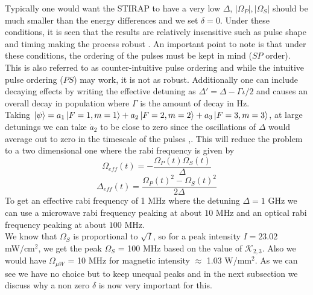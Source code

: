 \documentclass[%
 reprint,
 amsmath,amssymb,
 aps,
]{revtex4-2}
\begin{document}
Typically one would want the STIRAP to have a very low $\Delta$, $|\Omega_P|,|\Omega_S|$ should be much smaller than the energy differences and we set $\delta=0$. Under these conditions, it is seen that the results are relatively insensitive such as pulse shape and timing making the process robust \cite{stirap}. An important point to note is that under these conditions, the ordering of the pulses must be kept in mind ($SP$ order). This is also referred to as counter-intuitive pulse ordering and while the intuitive pulse ordering ($PS$) may work, it is not as robust. Additionally one can include decaying effects by writing the effective detuning as $\Delta' = \Delta - \Gamma\iota/2$ and causes an overall decay in population \cite{PhysRevA.56.1463} where $\Gamma$ is the amount of decay in Hz.\\
Taking $\ket{\psi} = a_1\ket{F=1,m=1}+a_2\ket{F=2,m=2}+a_3\ket{F=3,m=3}$, at large detunings we can take $\dot{a}_2$ to be close to zero since the oscillations of $\Delta$ would average out to zero in the timescale of the pulses \cite{book:693009},\cite{PhysRevA.55.648}. This will reduce the problem to a two dimensional one where the rabi frequency is given by
\begin{equation}\Omega_{eff}(t) = -\dfrac{\Omega_P(t)\Omega_S(t)}{\Delta}\end{equation}
\begin{equation}\Delta_{eff}(t) = \dfrac{\Omega_P(t)^2-\Omega_S(t)^2}{2\Delta}\end{equation}
To get an effective rabi frequency of 1 MHz where the detuning $\Delta = 1$ GHz we can use a microwave rabi frequency peaking at about $10$ MHz and an optical rabi frequency peaking at about $100$ MHz. \\
We know that $\Omega_S$ is proportional to $\sqrt{I}$, so for a peak intensity $I=23.02$ mW/cm$^2$, we get the peak $\Omega_S$ = 100 MHz based on the value of $\mathcal{K}_{2,3}$. Also we would have $\Omega_{\mu W}$ = 10 MHz for magnetic intensity $\approx$ 1.03 W/mm${}^2$. As we can see we have no choice but to keep unequal peaks and in the next subsection we discuss why a non zero $\delta$ is now very important for this.
\end{document}
